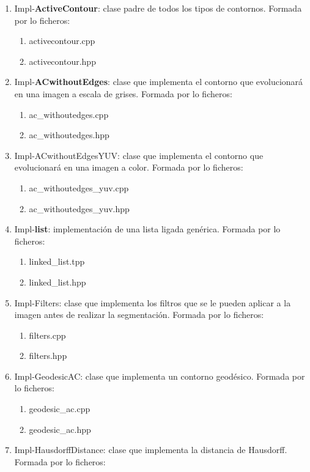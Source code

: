 \begin{enumerate}
	\item Impl-\textbf{ActiveContour}: clase padre de todos los tipos de contornos. Formada por lo ficheros:
		\begin{enumerate}
			\item activecontour.cpp
			\item activecontour.hpp
		\end{enumerate}
	\item Impl-\textbf{ACwithoutEdges}: clase que implementa el contorno que evolucionar\'{a} en una imagen a escala de grises. Formada por lo ficheros:
	\begin{enumerate}
		\item ac\_withoutedges.cpp
		\item ac\_withoutedges.hpp
	\end{enumerate}
	\item Impl-ACwithoutEdgesYUV: clase que implementa el contorno que evolucionar\'{a} en una imagen a color. Formada por lo ficheros:
	\begin{enumerate}
		\item ac\_withoutedges\_yuv.cpp
		\item ac\_withoutedges\_yuv.hpp
	\end{enumerate}
	\item Impl-\textbf{list}: implementaci\'{o}n de una lista ligada gen\'{e}rica. Formada por lo ficheros:
	\begin{enumerate}
		\item linked\_list.tpp
		\item linked\_list.hpp
	\end{enumerate}
	\item Impl-Filters: clase que implementa los filtros que se le pueden aplicar a la imagen antes de realizar la segmentaci\'{o}n. Formada por lo ficheros:
	\begin{enumerate}
		\item filters.cpp
		\item filters.hpp
	\end{enumerate}
	\item Impl-GeodesicAC: clase que implementa un contorno geod\'{e}sico. Formada por lo ficheros:
	\begin{enumerate}
		\item geodesic\_ac.cpp
		\item geodesic\_ac.hpp
	\end{enumerate}
	\item Impl-HausdorffDistance: clase que implementa la distancia de Hausdorff. Formada por lo ficheros:

\end{enumerate}
